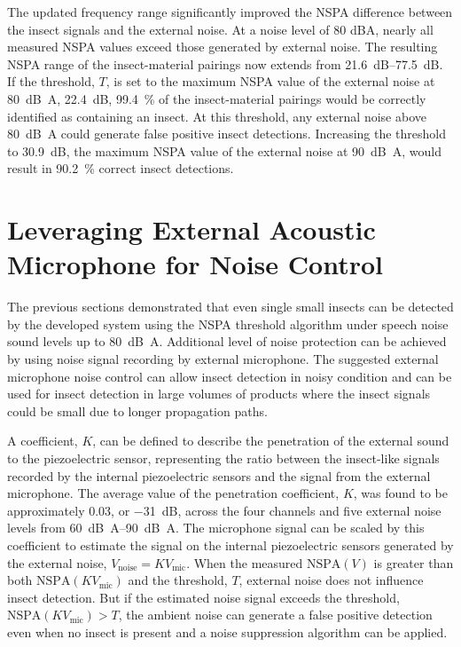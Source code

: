 \documentclass[../Vibro-Acoustic Signatures and Detection Algorithms for Stored Product Insects.tex]{subfiles}
\begin{document}
The updated frequency range significantly improved the NSPA difference between the insect signals and the external noise. At a noise level of 80 dBA, nearly all measured NSPA values exceed those generated by external noise. The resulting NSPA range of the insect-material pairings now extends from \SIrange{21.6}{77.5}{\deci\bel}. If the threshold, $T$, is set to the maximum NSPA value of the external noise at \SI{80}{\deci\bel A}, \SI{22.4}{\deci\bel}, \SI{99.4}{\percent} of the insect-material pairings would be correctly identified as containing an insect. At this threshold, any external noise above \SI{80}{\deci\bel A} could generate false positive insect detections. Increasing the threshold to \SI{30.9}{\deci\bel}, the maximum NSPA value of the external noise at \SI{90}{\deci\bel A}, would result in \SI{90.2}{\percent} correct insect detections.

\section{Leveraging External Acoustic Microphone for Noise Control}

The previous sections demonstrated that even single small insects can be detected by the developed system using the NSPA threshold algorithm under speech noise sound levels up to \SI{80}{\deci\bel A}. Additional level of noise protection can be achieved by using noise signal recording by external microphone. The suggested external microphone noise control can allow insect detection in noisy condition and can be used for insect detection in large volumes of products where the insect signals could be small due to longer propagation paths. 

A coefficient, $K$, can be defined to describe the penetration of the external sound to the piezoelectric sensor, representing the ratio between the insect-like signals recorded by the internal piezoelectric sensors and the signal from the external microphone. The average value of the penetration coefficient, $K$, was found to be approximately 0.03, or \SI{-31}{\deci\bel}, across the four channels and five external noise levels from \SIrange{60}{90}{\deci\bel A}. The microphone signal can be scaled by this coefficient to estimate the signal on the internal piezoelectric sensors generated by the external noise, $V_{\text{noise}} = KV_{\text{mic}}$. When the measured $\text{NSPA}(V)$ is greater than both $\text{NSPA}(KV_{\text{mic}})$ and the threshold, $T$, external noise does not influence insect detection. But if the estimated noise signal exceeds the threshold, $\text{NSPA}(KV_{\text{mic}}) > T$, the ambient noise can generate a false positive detection even when no insect is present and a noise suppression algorithm can be applied.
\end{document}
